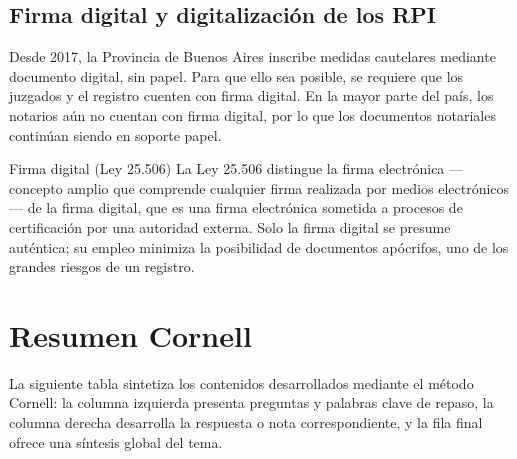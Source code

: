 \documentclass[12pt,oneside]{book}
\begin{document}
\section{Firma digital y digitalización de los RPI}

Desde 2017, la Provincia de Buenos Aires inscribe medidas cautelares mediante documento digital, sin papel. Para que ello sea posible, se requiere que los juzgados y el registro cuenten con firma digital. En la mayor parte del país, los notarios aún no cuentan con firma digital, por lo que los documentos notariales continúan siendo en soporte papel.

\begin{definition}{Firma digital (Ley 25.506)}
La Ley 25.506 distingue la firma electrónica —concepto amplio que comprende cualquier firma realizada por medios electrónicos— de la firma digital, que es una firma electrónica sometida a procesos de certificación por una autoridad externa. Solo la firma digital se presume auténtica; su empleo minimiza la posibilidad de documentos apócrifos, uno de los grandes riesgos de un registro.
\end{definition}


\chapter{Resumen Cornell}

La siguiente tabla sintetiza los contenidos desarrollados mediante el método Cornell: la columna izquierda presenta preguntas y palabras clave de repaso, la columna derecha desarrolla la respuesta o nota correspondiente, y la fila final ofrece una síntesis global del tema.
\end{document}
